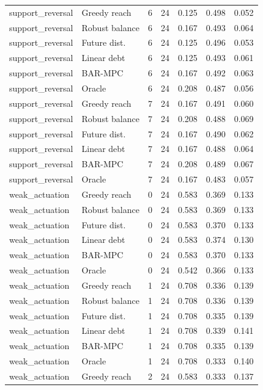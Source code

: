 \begin{longtable}{llrrrrr}
support\_reversal & Greedy reach & 6 & 24 & 0.125 & 0.498 & 0.052 \\
support\_reversal & Robust balance & 6 & 24 & 0.167 & 0.493 & 0.064 \\
support\_reversal & Future dist. & 6 & 24 & 0.125 & 0.496 & 0.053 \\
support\_reversal & Linear debt & 6 & 24 & 0.125 & 0.493 & 0.061 \\
support\_reversal & BAR-MPC & 6 & 24 & 0.167 & 0.492 & 0.063 \\
support\_reversal & Oracle & 6 & 24 & 0.208 & 0.487 & 0.056 \\
support\_reversal & Greedy reach & 7 & 24 & 0.167 & 0.491 & 0.060 \\
support\_reversal & Robust balance & 7 & 24 & 0.208 & 0.488 & 0.069 \\
support\_reversal & Future dist. & 7 & 24 & 0.167 & 0.490 & 0.062 \\
support\_reversal & Linear debt & 7 & 24 & 0.167 & 0.488 & 0.064 \\
support\_reversal & BAR-MPC & 7 & 24 & 0.208 & 0.489 & 0.067 \\
support\_reversal & Oracle & 7 & 24 & 0.167 & 0.483 & 0.057 \\
weak\_actuation & Greedy reach & 0 & 24 & 0.583 & 0.369 & 0.133 \\
weak\_actuation & Robust balance & 0 & 24 & 0.583 & 0.369 & 0.133 \\
weak\_actuation & Future dist. & 0 & 24 & 0.583 & 0.370 & 0.133 \\
weak\_actuation & Linear debt & 0 & 24 & 0.583 & 0.374 & 0.130 \\
weak\_actuation & BAR-MPC & 0 & 24 & 0.583 & 0.370 & 0.133 \\
weak\_actuation & Oracle & 0 & 24 & 0.542 & 0.366 & 0.133 \\
weak\_actuation & Greedy reach & 1 & 24 & 0.708 & 0.336 & 0.139 \\
weak\_actuation & Robust balance & 1 & 24 & 0.708 & 0.336 & 0.139 \\
weak\_actuation & Future dist. & 1 & 24 & 0.708 & 0.335 & 0.139 \\
weak\_actuation & Linear debt & 1 & 24 & 0.708 & 0.339 & 0.141 \\
weak\_actuation & BAR-MPC & 1 & 24 & 0.708 & 0.335 & 0.139 \\
weak\_actuation & Oracle & 1 & 24 & 0.708 & 0.333 & 0.140 \\
weak\_actuation & Greedy reach & 2 & 24 & 0.583 & 0.333 & 0.137 \\

\end{longtable}
